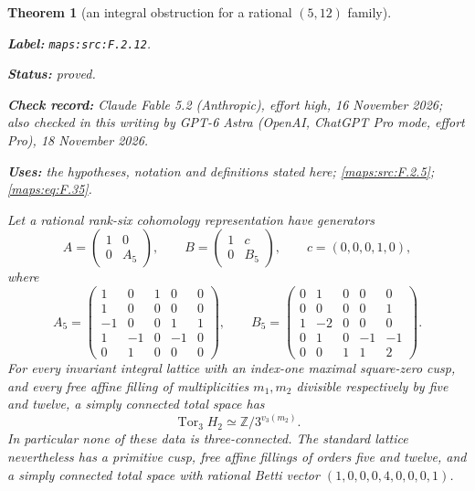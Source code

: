 \documentclass[11pt,a4paper]{article}
\newtheorem{theorem}{Theorem}[section]
\theoremstyle{definition}
\newcommand{\StatementRecord}[4]{\par\smallskip\begingroup\upshape\raggedright\noindent\textbf{Label:} \nolinkurl{#1}.\par\noindent\textbf{Status:} #2.\par\noindent\textbf{Check record:} #3.\par\noindent\textbf{Uses:} #4.\par\endgroup\smallskip}
\newcommand{\CurrentChecker}{GPT-6 Astra (OpenAI, ChatGPT Pro mode, effort Pro), 18 November 2026}
\begin{document}
\begin{theorem}[an integral obstruction for a rational $(5,12)$ family]\label{maps:src:F.2.12}
\StatementRecord{maps:src:F.2.12}{proved}{Claude Fable 5.2 (Anthropic), effort high, 16 November 2026; also checked in this writing by \CurrentChecker}{the hypotheses, notation and definitions stated here; \cref{maps:src:F.2.5}; \cref{maps:eq:F.35}}


Let a rational rank-six cohomology representation have generators
\[
 A=\begin{pmatrix}1&0\\0&A_5\end{pmatrix},\qquad
 B=\begin{pmatrix}1&c\\0&B_5\end{pmatrix},\qquad
 c=(0,0,0,1,0),
\]
where
\[
 A_5=\begin{pmatrix}
 1&0&1&0&0\\1&0&0&0&0\\-1&0&0&1&1\\
 1&-1&0&-1&0\\0&1&0&0&0
 \end{pmatrix},\qquad
 B_5=\begin{pmatrix}
 0&1&0&0&0\\0&0&0&0&1\\1&-2&0&0&0\\
 0&1&0&-1&-1\\0&0&1&1&2
 \end{pmatrix}.
 \tag{F.33}\label{maps:eq:F.33}
\]
For every invariant integral lattice with an index-one maximal
square-zero cusp, and every free affine filling of multiplicities
$m_1,m_2$ divisible respectively by five and twelve, a simply
connected total space has
\[
 \operatorname{Tor}_3 H_2
       \simeq\mathbb Z/3^{v_3(m_2)}.
 \tag{F.34}\label{maps:eq:F.34}
\]
In particular none of these data is three-connected.
The standard lattice nevertheless has a primitive cusp,
free affine fillings of orders five and twelve, and a simply
connected total space with rational Betti vector
$(1,0,0,0,4,0,0,0,1)$.

\end{theorem}
\end{document}

